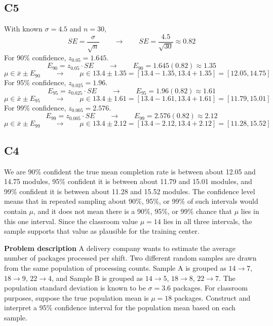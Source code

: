 \begin{ExamProblems}
		\subsection*{C5}
		With known $\sigma = 4.5$ and $n=30$,
		\[
		SE = \frac{\sigma}{\sqrt{n}} \qquad \longrightarrow \qquad SE = \frac{4.5}{\sqrt{30}} \approx 0.82
		\]
		For 90\% confidence, $z_{0.05}=1.645$.
		\[
		E_{90} = z_{0.05} \cdot SE \qquad \longrightarrow \qquad E_{90} = 1.645(0.82) \approx 1.35
		\]
		\[
		\mu \in \bar{x} \pm E_{90} \qquad \longrightarrow \qquad \mu \in 13.4 \pm 1.35 = [13.4 - 1.35, 13.4 + 1.35] = [12.05, 14.75]
		\]
		For 95\% confidence, $z_{0.025}=1.96$.
		\[
		E_{95} = z_{0.025} \cdot SE \qquad \longrightarrow \qquad E_{95} = 1.96(0.82) \approx 1.61
		\]
		\[
		\mu \in \bar{x} \pm E_{95} \qquad \longrightarrow \qquad \mu \in 13.4 \pm 1.61 = [13.4 - 1.61, 13.4 + 1.61] = [11.79, 15.01]
		\]
		For 99\% confidence, $z_{0.005}=2.576$.
		\[
		E_{99} = z_{0.005} \cdot SE \qquad \longrightarrow \qquad E_{99} = 2.576(0.82) \approx 2.12
		\]
		\[
		\mu \in \bar{x} \pm E_{99} \qquad \longrightarrow \qquad \mu \in 13.4 \pm 2.12 = [13.4 - 2.12, 13.4 + 2.12] = [11.28, 15.52]
		\]

		\subsection*{C4}
		We are 90\% confident the true mean completion rate is between about 12.05 and 14.75 modules, 95\% confident it is between about 11.79 and 15.01 modules, and 99\% confident it is between about 11.28 and 15.52 modules. The confidence level means that in repeated sampling about 90\%, 95\%, or 99\% of such intervals would contain $\mu$, and it does not mean there is a 90\%, 95\%, or 99\% chance that $\mu$ lies in this one interval. Since the classroom value $\mu = 14$ lies in all three intervals, the sample supports that value as plausible for the training center.

		\newpage
		\item
		\textbf{Problem description}
		A delivery company wants to estimate the average number of packages processed per shift.
		Two different random samples are drawn from the same population of processing counts.
		Sample A is grouped as \(14 \rightarrow 7\), \(18 \rightarrow 9\), \(22 \rightarrow 4\), and Sample B is grouped as \(14 \rightarrow 5\), \(18 \rightarrow 8\), \(22 \rightarrow 7\).
		The population standard deviation is known to be \(\sigma = 3.6\) packages.
		For classroom purposes, suppose the true population mean is \(\mu = 18\) packages.
		Construct and interpret a 95\% confidence interval for the population mean based on each sample.


\end{ExamProblems}
